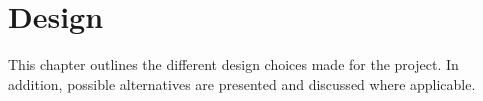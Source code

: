 \chapter{Design}
This chapter outlines the different design choices made for the project. In addition, possible alternatives are presented and discussed where applicable.
